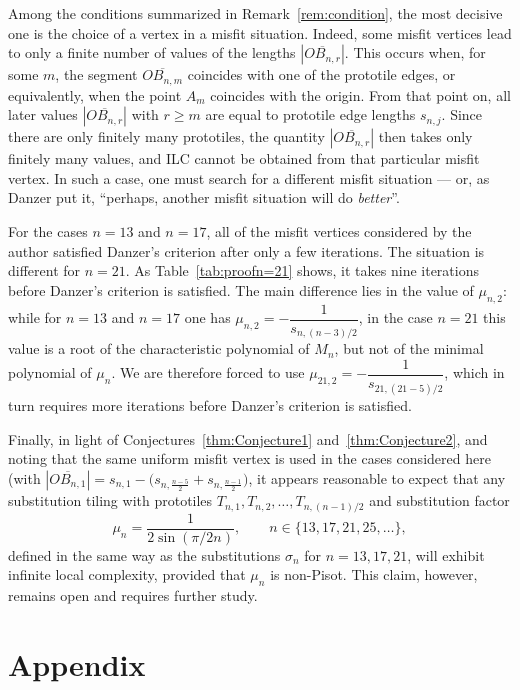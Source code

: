 \documentclass[preprint, 12pt]{article}
\theoremstyle{plain}
\theoremstyle{myremark}
\theoremstyle{definition}
\begin{document}
Among the conditions summarized in Remark~\ref{rem:condition}, the most decisive one is the choice of a vertex in a misfit situation. Indeed, some misfit vertices lead to only a finite number of values of the lengths $|\overline{OB_{n,r}}|$. This occurs when, for some $m$, the segment $\overline{OB_{n,m}}$ coincides with one of the prototile edges, or equivalently, when the point $A_m$ coincides with the origin. From that point on, all later values $|\overline{OB_{n,r}}|$ with $r \ge m$ are equal to prototile edge lengths $s_{n,j}$. Since there are only finitely many prototiles, the quantity $|\overline{OB_{n,r}}|$ then takes only finitely many values, and ILC cannot be obtained from that particular misfit vertex. In such a case, one must search for a different misfit situation --- or, as Danzer put it, ``perhaps, another misfit situation will do \textit{better}''.

For the cases $n = 13$ and $n = 17$, all of the misfit vertices considered by the author satisfied Danzer’s criterion after only a few iterations. The situation is different for $n = 21$. As Table~\ref{tab:proofn=21} shows, it takes nine iterations before Danzer’s criterion is satisfied. The main difference lies in the value of $\mu_{n,2}$: while for $n = 13$ and $n = 17$ one has $\mu_{n,2} = -\dfrac{1}{s_{n,(n-3)/2}}$, in the case $n = 21$ this value is a root of the characteristic polynomial of $M_n$, but not of the minimal polynomial of $\mu_n$. We are therefore forced to use $\mu_{21,2} = -\dfrac{1}{s_{21,(21-5)/2}}$, which in turn requires more iterations before Danzer’s criterion is satisfied.

Finally, in light of Conjectures~\ref{thm:Conjecture1} and~\ref{thm:Conjecture2}, and noting that the same uniform misfit vertex is used in the cases considered here (with
$|\overline{OB_{n,1}}| = s_{n,1} - \bigl(s_{n,\frac{n-5}{2}} + s_{n,\frac{n-1}{2}}\bigr)$,
it appears reasonable to expect that any substitution tiling with prototiles $T_{n,1}, T_{n,2}, \ldots, T_{n,(n-1)/2}$ and substitution factor
\[
\mu_n = \frac{1}{2\sin(\pi/2n)}, \qquad n \in \{13,17,21,25,\ldots\},
\]
defined in the same way as the substitutions $\sigma_n$ for $n = 13, 17, 21$, will exhibit infinite local complexity, provided that $\mu_n$ is non-Pisot.  
This claim, however, remains open and requires further study.


\section*{Appendix}
\end{document}

